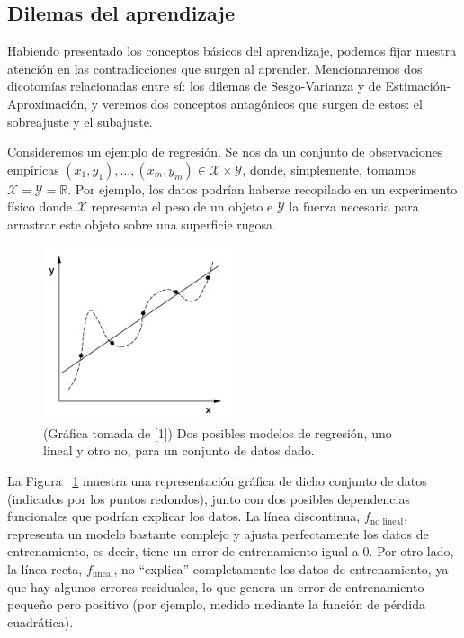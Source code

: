 \documentclass{report}
\begin{document}
\subsection{Dilemas del aprendizaje}

Habiendo presentado los conceptos básicos del aprendizaje, podemos fijar nuestra atención en las contradicciones que surgen
al aprender. Mencionaremos dos dicotomías relacionadas entre sí: los dilemas de Sesgo-Varianza y de Estimación-Aproximación,
y veremos dos conceptos antagónicos que surgen de estos: el sobreajuste y el subajuste.\newline


Consideremos un ejemplo de regresión. Se nos da un conjunto de observaciones empíricas 
\((x_1, y_1), \dots, (x_m, y_m) \in \mathcal{X} \times \mathcal{Y}\), donde, simplemente, tomamos \(\mathcal{X} = \mathcal{Y} = \mathbb{R}\). 
Por ejemplo, los datos podrían haberse recopilado en un experimento físico donde \(\mathcal{X}\) representa el peso 
de un objeto e \(\mathcal{Y}\) la fuerza necesaria para arrastrar este objeto sobre una superficie rugosa.\newline

\begin{figure}[ht!]
    \centering
    \includegraphics[width=0.5\textwidth]{Images/1.png}
    \caption{(Gráfica tomada de [1]) Dos posibles modelos de regresión, uno lineal y otro no, para un conjunto de datos dado.}
    \label{fig:Sobreajuste y subajuste}
\end{figure}

La Figura ~\ref{fig:Sobreajuste y subajuste} muestra una representación gráfica de dicho conjunto de datos (indicados por los puntos redondos), 
junto con dos posibles dependencias funcionales que podrían explicar los datos. 
La línea discontinua, \(f_{\text{no lineal}}\), representa un modelo bastante complejo y ajusta perfectamente 
los datos de entrenamiento, es decir, tiene un error de entrenamiento igual a 0. Por otro lado, 
la línea recta, \(f_{\text{lineal}}\), no “explica” completamente los datos de entrenamiento, 
ya que hay algunos errores residuales, lo que genera un error de entrenamiento pequeño pero positivo 
(por ejemplo, medido mediante la función de pérdida cuadrática).\newline
\end{document}
